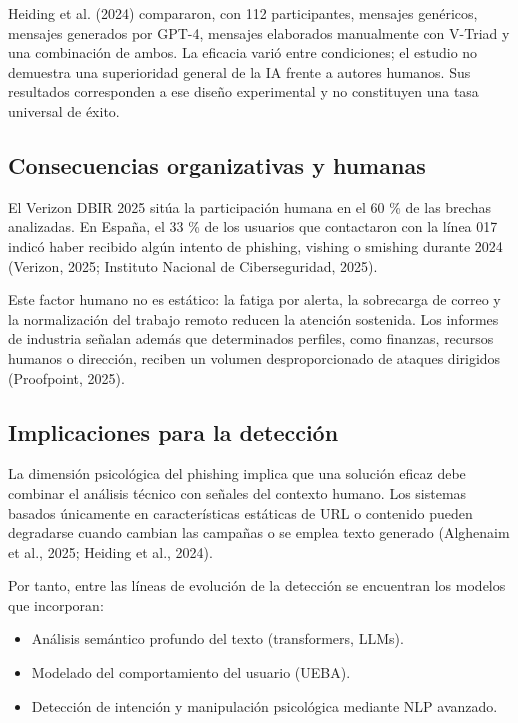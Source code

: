 \documentclass[11pt,a4paper,oneside]{report}
\begin{document}
Heiding et al. (2024) compararon, con 112 participantes, mensajes genéricos, mensajes generados por GPT-4, mensajes elaborados manualmente con V-Triad y una combinación de ambos. La eficacia varió entre condiciones; el estudio no demuestra una superioridad general de la IA frente a autores humanos. Sus resultados corresponden a ese diseño experimental y no constituyen una tasa universal de éxito.

\subsection{Consecuencias organizativas y humanas}

El Verizon DBIR 2025 sitúa la participación humana en el 60 \% de las brechas analizadas. En España, el 33 \% de los usuarios que contactaron con la línea 017 indicó haber recibido algún intento de phishing, vishing o smishing durante 2024 (Verizon, 2025; Instituto Nacional de Ciberseguridad, 2025).

Este factor humano no es estático: la fatiga por alerta, la sobrecarga de correo y la normalización del trabajo remoto reducen la atención sostenida. Los informes de industria señalan además que determinados perfiles, como finanzas, recursos humanos o dirección, reciben un volumen desproporcionado de ataques dirigidos (Proofpoint, 2025).

\subsection{Implicaciones para la detección}

La dimensión psicológica del phishing implica que una solución eficaz debe combinar el análisis técnico con señales del contexto humano. Los sistemas basados únicamente en características estáticas de URL o contenido pueden degradarse cuando cambian las campañas o se emplea texto generado (Alghenaim et al., 2025; Heiding et al., 2024).

Por tanto, entre las líneas de evolución de la detección se encuentran los modelos que incorporan:

\begin{itemize}[nosep]
  \item Análisis semántico profundo del texto (transformers, LLMs).
  \item Modelado del comportamiento del usuario (UEBA).
  \item Detección de intención y manipulación psicológica mediante NLP avanzado.
\end{itemize}
\end{document}
